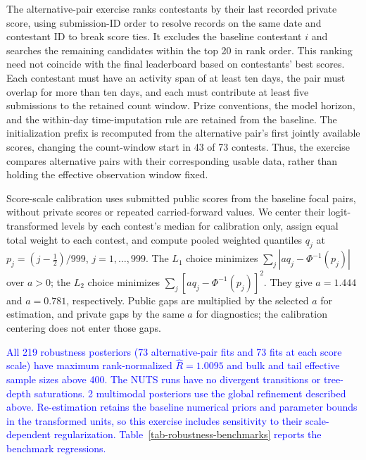 \documentclass[mnsc]{informs3}
\begin{document}
\begin{APPENDICES}
{The alternative-pair exercise ranks contestants by their last recorded private score, using submission-ID order to resolve records on the same date and contestant ID to break score ties. It excludes the baseline contestant $i$ and searches the remaining candidates within the top 20 in rank order. This ranking need not coincide with the final leaderboard based on contestants' best scores. Each contestant must have an activity span of at least ten days, the pair must overlap for more than ten days, and each must contribute at least five submissions to the retained count window. Prize conventions, the model horizon, and the within-day time-imputation rule are retained from the baseline. The initialization prefix is recomputed from the alternative pair's first jointly available scores, changing the count-window start in 43 of 73 contests. Thus, the exercise compares alternative pairs with their corresponding usable data, rather than holding the effective observation window fixed.}

{Score-scale calibration uses submitted public scores from the baseline focal pairs, without private scores or repeated carried-forward values. We center their logit-transformed levels by each contest's median for calibration only, assign equal total weight to each contest, and compute pooled weighted quantiles $q_j$ at $p_j=(j-\tfrac12)/999$, $j=1,\ldots,999$. The $L_1$ choice minimizes $\sum_j|a q_j-\Phi^{-1}(p_j)|$ over $a>0$; the $L_2$ choice minimizes $\sum_j[a q_j-\Phi^{-1}(p_j)]^2$. They give $a=1.444$ and $a=0.781$, respectively. Public gaps are multiplied by the selected $a$ for estimation, and private gaps by the same $a$ for diagnostics; the calibration centering does not enter those gaps.}

\textcolor{blue}{All 219 robustness posteriors (73 alternative-pair fits and 73 fits at each score scale) have maximum rank-normalized $\widehat R=1.0095$ and bulk and tail effective sample sizes above 400. The NUTS runs have no divergent transitions or tree-depth saturations. 2 multimodal posteriors use the global refinement described above. Re-estimation retains the baseline numerical priors and parameter bounds in the transformed units, so this exercise includes sensitivity to their scale-dependent regularization. Table~\ref{tab-robustness-benchmarks} reports the benchmark regressions.}


\end{APPENDICES}
\end{document}
